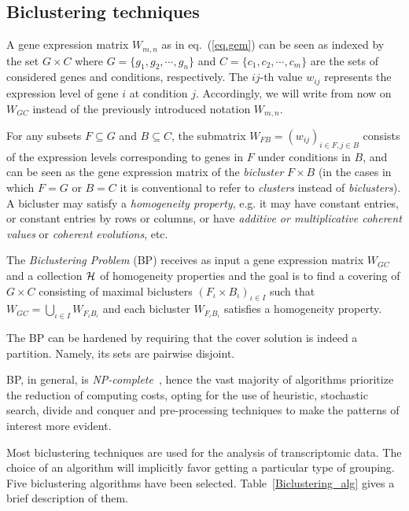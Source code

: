 \documentclass[a4paper,conference]{IEEEtran}
\begin{document}
\subsection{Biclustering techniques}

A gene expression matrix $W_{m,n}$ as in eq.~(\ref{eq.gem}) can be seen as indexed by the set $G\times C$ where $G=\{g_1, g_2, \cdots, g_n\}$ and $C=\{c_1, c_2, \cdots, c_m\}$ are the sets of considered genes and conditions, respectively. The $ij$-th value $w_{ij}$ represents the expression level of gene $i$ at condition $j$. Accordingly, we will write from now on $W_{GC}$ instead of the previously introduced notation $W_{m,n}$.

For any subsets $F\subseteq G$ and $B\subseteq C$, the submatrix $W_{FB} = \left(w_{ij}\right)_{i\in F,j\in B}$ consists of the expression levels corresponding to genes in $F$ under conditions in $B$, and can be seen as the gene expression matrix of the {\em bicluster} $F\times B$ (in the cases in which $F=G$ or $B=C$ it is conventional to refer to {\em clusters} instead of {\em biclusters}). A bicluster may satisfy a {\em homogeneity property}, e.g. it may have constant entries, or constant entries by rows or columns, or have {\em additive or multiplicative coherent values} or {\em coherent evolutions}, etc.

The {\em Biclustering Problem} (BP) receives as input a gene expression matrix $W_{GC}$ and a collection ${\cal H}$ of homogeneity properties and the goal is to find a covering of $G\times C$ consisting of maximal biclusters $\left(F_{\iota}\times B_{\iota}\right)_{\iota\in I}$ such that $W_{GC} = \bigcup_{\iota\in I} W_{F_{\iota}B_{\iota}}$ and each bicluster $W_{F_{\iota}B_{\iota}}$ satisfies a homogeneity property.

The BP can be hardened by requiring that the cover solution is indeed a partition. Namely, its sets are pairwise disjoint.

BP, in general, is \textit{NP-complete}~\cite{pontes2015biclustering}, hence the vast majority of algorithms prioritize the reduction of computing costs, opting for the use of heuristic, stochastic search, divide and conquer and pre-processing techniques to make the patterns of interest more evident.

Most biclustering techniques are used for the analysis of transcriptomic data. The choice of an algorithm will implicitly favor getting a particular type of grouping. Five biclustering algorithms have been selected. Table~\ref{Biclustering_alg} gives a brief description of them. 
\end{document}
